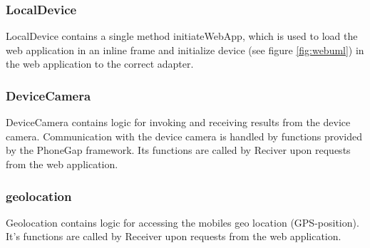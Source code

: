 \subsubsection{LocalDevice}
LocalDevice contains a single method initiateWebApp, which is used to load the web application in an inline frame and initialize device (see figure \ref{fig:webuml}) in the web application to the correct adapter.
\subsubsection{DeviceCamera}
DeviceCamera contains logic for invoking and receiving results from the device camera. Communication with the device camera is handled by functions provided by the PhoneGap framework. Its functions are called by Reciver upon requests from the web application.
\subsubsection{geolocation}
Geolocation contains logic for accessing the mobiles geo location (GPS-position). It's functions are called by Receiver upon requests from the web application.

